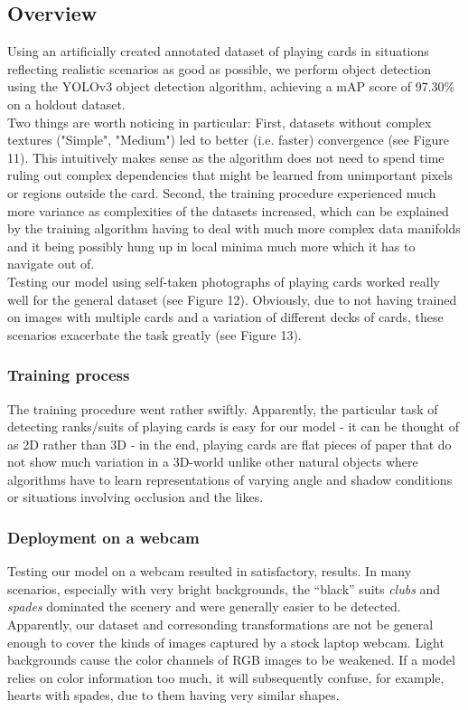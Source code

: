 \documentclass[a4paper]{article}
\begin{document}
\subsection*{Overview}
Using an artificially created annotated dataset of playing cards in situations reflecting realistic scenarios as good as possible, we perform object detection using the YOLOv3 object detection algorithm, achieving a mAP score of 97.30\% on a holdout dataset. \\ 
Two things are worth noticing in particular: 
 First, datasets without complex textures ("Simple", "Medium") led to better (i.e. faster) convergence (see Figure 11). This intuitively makes sense as the algorithm does not need to spend time ruling out complex dependencies that might be learned from unimportant pixels or regions outside the card. Second, the training procedure experienced much more variance as complexities of the datasets increased, which can be explained by the training algorithm having to deal with much more complex data manifolds and it being possibly hung up in local minima much more which it has to navigate out of. \\
 Testing our model using self-taken photographs of playing cards worked really well for the general dataset (see Figure 12). Obviously, due to not having trained on images with multiple cards and a variation of different decks of cards, these scenarios exacerbate the task greatly (see Figure 13).
\subsubsection*{Training process}
The training procedure went rather swiftly. Apparently,  the particular task of detecting ranks/suits of playing cards is easy for our model - it can be thought of as 2D rather than 3D - in the end, playing cards are flat pieces of paper that do not show much variation in a 3D-world unlike other natural objects where algorithms have to learn representations of varying angle and shadow conditions or situations involving occlusion and the likes. \\
\subsubsection*{Deployment on a webcam}
Testing our model on a webcam resulted in satisfactory,  results. In many scenarios, especially with very bright backgrounds, the ``black'' suits \textit{clubs} and \textit{spades} dominated the scenery and were generally easier to be detected. Apparently, our dataset and corresonding transformations are not be general enough to cover the kinds of images captured by a stock laptop webcam. Light backgrounds cause the color channels of RGB images to be weakened. If a model relies on color information too much, it will subsequently confuse, for example, hearts with spades, due to them having very similar shapes.
\end{document}
